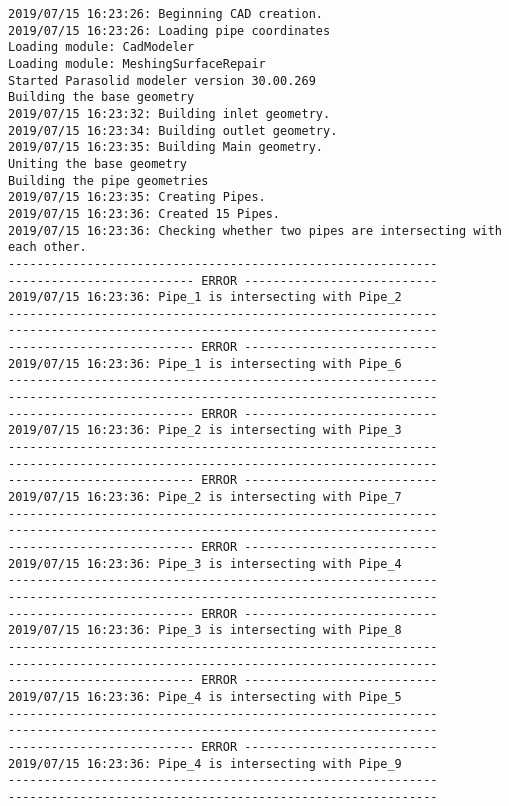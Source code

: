 \documentclass{article}
\begin{document}
{\tiny 
\begin{verbatim}
2019/07/15 16:23:26: Beginning CAD creation.
2019/07/15 16:23:26: Loading pipe coordinates
Loading module: CadModeler
Loading module: MeshingSurfaceRepair
Started Parasolid modeler version 30.00.269
Building the base geometry
2019/07/15 16:23:32: Building inlet geometry.
2019/07/15 16:23:34: Building outlet geometry.
2019/07/15 16:23:35: Building Main geometry.
Uniting the base geometry
Building the pipe geometries
2019/07/15 16:23:35: Creating Pipes.
2019/07/15 16:23:36: Created 15 Pipes.
2019/07/15 16:23:36: Checking whether two pipes are intersecting with each other.
------------------------------------------------------------
-------------------------- ERROR ---------------------------
2019/07/15 16:23:36: Pipe_1 is intersecting with Pipe_2
------------------------------------------------------------
------------------------------------------------------------
-------------------------- ERROR ---------------------------
2019/07/15 16:23:36: Pipe_1 is intersecting with Pipe_6
------------------------------------------------------------
------------------------------------------------------------
-------------------------- ERROR ---------------------------
2019/07/15 16:23:36: Pipe_2 is intersecting with Pipe_3
------------------------------------------------------------
------------------------------------------------------------
-------------------------- ERROR ---------------------------
2019/07/15 16:23:36: Pipe_2 is intersecting with Pipe_7
------------------------------------------------------------
------------------------------------------------------------
-------------------------- ERROR ---------------------------
2019/07/15 16:23:36: Pipe_3 is intersecting with Pipe_4
------------------------------------------------------------
------------------------------------------------------------
-------------------------- ERROR ---------------------------
2019/07/15 16:23:36: Pipe_3 is intersecting with Pipe_8
------------------------------------------------------------
------------------------------------------------------------
-------------------------- ERROR ---------------------------
2019/07/15 16:23:36: Pipe_4 is intersecting with Pipe_5
------------------------------------------------------------
------------------------------------------------------------
-------------------------- ERROR ---------------------------
2019/07/15 16:23:36: Pipe_4 is intersecting with Pipe_9
------------------------------------------------------------
------------------------------------------------------------

\end{verbatim}}
\end{document}
